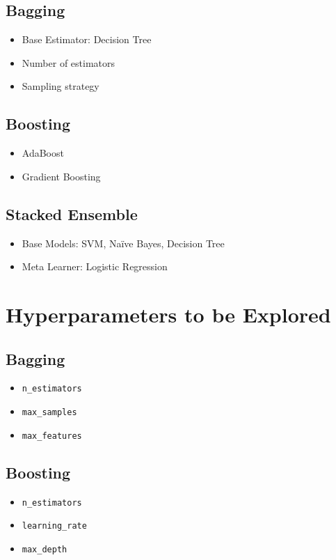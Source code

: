 \documentclass[11pt]{article}
\begin{document}
\subsection*{Bagging}
\begin{itemize}
    \item Base Estimator: Decision Tree
    \item Number of estimators
    \item Sampling strategy
\end{itemize}

\subsection*{Boosting}
\begin{itemize}
    \item AdaBoost
    \item Gradient Boosting
\end{itemize}

\subsection*{Stacked Ensemble}
\begin{itemize}
    \item Base Models: SVM, Na\"ive Bayes, Decision Tree
    \item Meta Learner: Logistic Regression
\end{itemize}


\section*{Hyperparameters to be Explored}

\subsection*{Bagging}
\begin{itemize}
    \item \texttt{n\_estimators}
    \item \texttt{max\_samples}
    \item \texttt{max\_features}
\end{itemize}

\subsection*{Boosting}
\begin{itemize}
    \item \texttt{n\_estimators}
    \item \texttt{learning\_rate}
    \item \texttt{max\_depth}
\end{itemize}
\end{document}
